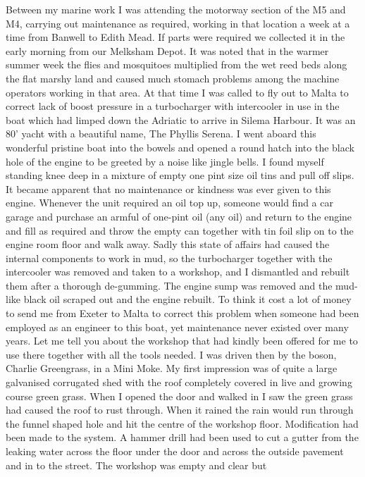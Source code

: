Between my marine work I was attending the motorway section of the M5 and M4,
carrying out maintenance as required, working in that location a week at a time
from Banwell to Edith Mead. If parts were required we collected it in the early
morning from our Melksham Depot. It was noted that in the warmer summer week
the flies and mosquitoes multiplied from the wet reed beds along the flat
marshy land and caused much stomach problems among the machine operators
working in that area. At that time I was called to fly out to Malta to correct
lack of boost pressure in a turbocharger with intercooler in use in the boat
which had limped down the Adriatic to arrive in Silema Harbour. It was an 80'
yacht with a beautiful name, The Phyllis Serena. I went aboard this wonderful
pristine boat into the bowels and opened a round hatch into the black hole of
the engine to be greeted by a noise like jingle bells. I found myself standing
knee deep in a mixture of empty one pint size oil tins and pull off slips. It
became apparent that no maintenance or kindness was ever given to this engine.
Whenever the unit required an oil top up, someone would find a car garage and
purchase an armful of one-pint oil (any oil) and return to the engine and fill
as required and throw the empty can together with tin foil slip on to the
engine room floor and walk away. Sadly this state of affairs had caused the
internal components to work in mud, so the turbocharger together with the
intercooler was removed and taken to a workshop, and I dismantled and rebuilt
them after a thorough de-gumming. The engine sump was removed and the mud-like
black oil scraped out and the engine rebuilt. To think it cost a lot of money
to send me from Exeter to Malta to correct this problem when someone had been
employed as an engineer to this boat, yet maintenance never existed over many
years. Let me tell you about the workshop that had kindly been offered for me
to use there together with all the tools needed. I was driven then by the
boson, Charlie Greengrass, in a Mini Moke. My first impression was of quite a
large galvanised corrugated shed with the roof completely covered in live and
growing course green grass. When I opened the door and walked in I saw the
green grass had caused the roof to rust through. When it rained the rain would
run through the funnel shaped hole and hit the centre of the workshop floor.
Modification had been made to the system. A hammer drill had been used to cut a
gutter from the leaking water across the floor under the door and across the
outside pavement and in to the street. The workshop was empty and clear but
